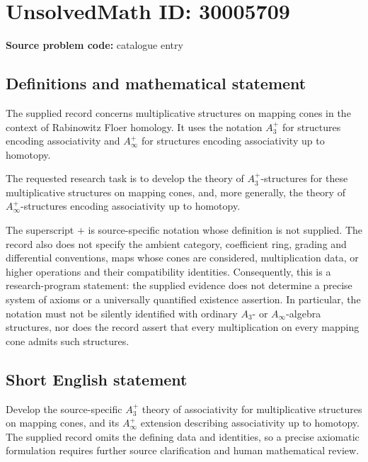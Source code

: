 \documentclass[11pt]{article}
\begin{document}
\section*{UnsolvedMath ID: 30005709}
\textbf{Source problem code:} catalogue entry
\subsection{Definitions and mathematical statement}
The supplied record concerns multiplicative structures on mapping cones in the context of Rabinowitz Floer homology. It uses the notation \(A_3^+\) for structures encoding associativity and \(A_\infty^+\) for structures encoding associativity up to homotopy.

The requested research task is to develop the theory of \(A_3^+\)-structures for these multiplicative structures on mapping cones, and, more generally, the theory of \(A_\infty^+\)-structures encoding associativity up to homotopy.

The superscript \(+\) is source-specific notation whose definition is not supplied. The record also does not specify the ambient category, coefficient ring, grading and differential conventions, maps whose cones are considered, multiplication data, or higher operations and their compatibility identities. Consequently, this is a research-program statement: the supplied evidence does not determine a precise system of axioms or a universally quantified existence assertion. In particular, the notation must not be silently identified with ordinary \(A_3\)- or \(A_\infty\)-algebra structures, nor does the record assert that every multiplication on every mapping cone admits such structures.
\subsection{Short English statement}
Develop the source-specific \(A_3^+\) theory of associativity for multiplicative structures on mapping cones, and its \(A_\infty^+\) extension describing associativity up to homotopy. The supplied record omits the defining data and identities, so a precise axiomatic formulation requires further source clarification and human mathematical review.
\end{document}
